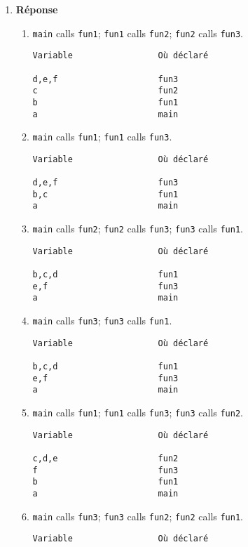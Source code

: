 \documentclass[12pt]{book}
\begin{document}
\begin{enumerate}
    \item \textbf{Réponse}
    \begin{enumerate}
        \item \texttt{main} calls \texttt{fun1}; \texttt{fun1} calls \texttt{fun2}; \texttt{fun2} calls \texttt{fun3}.
\begin{verbatim}
Variable                 Où déclaré

d,e,f                    fun3
c                        fun2
b                        fun1
a                        main
\end{verbatim}
        \item \texttt{main} calls \texttt{fun1}; \texttt{fun1} calls \texttt{fun3}.
\begin{verbatim}
Variable                 Où déclaré

d,e,f                    fun3
b,c                      fun1
a                        main
\end{verbatim}
        \item \texttt{main} calls \texttt{fun2}; \texttt{fun2} calls \texttt{fun3}; \texttt{fun3} calls \texttt{fun1}.
\begin{verbatim}
Variable                 Où déclaré

b,c,d                    fun1
e,f                      fun3
a                        main
\end{verbatim}
        \item \texttt{main} calls \texttt{fun3}; \texttt{fun3} calls \texttt{fun1}.
\begin{verbatim}
Variable                 Où déclaré

b,c,d                    fun1
e,f                      fun3
a                        main
\end{verbatim}
        \item \texttt{main} calls \texttt{fun1}; \texttt{fun1} calls \texttt{fun3}; \texttt{fun3} calls \texttt{fun2}.
\begin{verbatim}
Variable                 Où déclaré

c,d,e                    fun2
f                        fun3
b                        fun1
a                        main
\end{verbatim}
        \item \texttt{main} calls \texttt{fun3}; \texttt{fun3} calls \texttt{fun2}; \texttt{fun2} calls \texttt{fun1}.
\begin{verbatim}
Variable                 Où déclaré


\end{verbatim}
\end{enumerate}
\end{enumerate}
\end{document}
